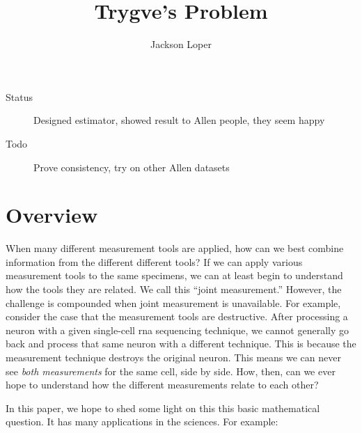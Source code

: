 




\title{Trygve's Problem}
\author{Jackson Loper}

\usepackage{amsthm}
\newtheorem{thm}{Theorem}
\newtheorem{conj}{Conjecture}


\maketitle

\begin{description}
  \item[Status] Designed estimator, showed result to Allen people, they seem happy
  \item[Todo] Prove consistency, try on other Allen datasets
\end{description}


\section{Overview}

When many different measurement tools are applied, how can we best combine information from the different different tools?  If we can apply various measurement tools to the same specimens, we can at least begin to understand how the tools they are related.  We call this ``joint measurement.''  However, the challenge is compounded when joint measurement is unavailable.  For example, consider the case that the measurement tools are destructive.  After processing a neuron with a given single-cell rna sequencing technique, we cannot generally go back and process that same neuron with a different technique.  This is because the measurement technique destroys the original neuron.  This means we can never see \emph{both measurements} for the same cell, side by side.  How, then, can we ever hope to understand how the different measurements relate to each other?

In this paper, we hope to shed some light on this this basic mathematical question.  It has many applications in the sciences.  For example:

